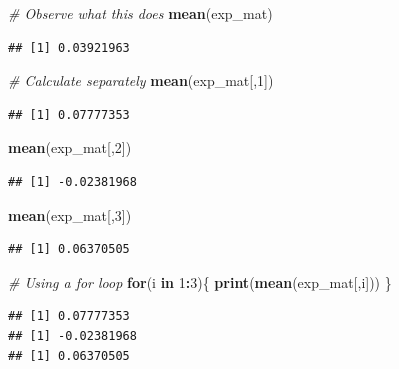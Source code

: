 \documentclass[12pt,]{krantz}
\newenvironment{Shaded}{\begin{snugshade}}{\end{snugshade}}
\newcommand{\KeywordTok}[1]{\textcolor[rgb]{0.27,0.27,0.27}{\textbf{#1}}}
\newcommand{\DecValTok}[1]{\textcolor[rgb]{0.06,0.06,0.06}{#1}}
\newcommand{\CommentTok}[1]{\textcolor[rgb]{0.37,0.37,0.37}{\textit{#1}}}
\newcommand{\ControlFlowTok}[1]{\textcolor[rgb]{0.27,0.27,0.27}{\textbf{#1}}}
\newcommand{\OperatorTok}[1]{\textcolor[rgb]{0.43,0.43,0.43}{\textbf{#1}}}
\newcommand{\NormalTok}[1]{#1}
\begin{document}
\begin{Shaded}
\begin{Highlighting}[]
\CommentTok{# Observe what this does}
\KeywordTok{mean}\NormalTok{(exp_mat)}
\end{Highlighting}
\end{Shaded}

\begin{verbatim}
## [1] 0.03921963
\end{verbatim}

\begin{Shaded}
\begin{Highlighting}[]
\CommentTok{# Calculate separately }
\KeywordTok{mean}\NormalTok{(exp_mat[,}\DecValTok{1}\NormalTok{])}
\end{Highlighting}
\end{Shaded}

\begin{verbatim}
## [1] 0.07777353
\end{verbatim}

\begin{Shaded}
\begin{Highlighting}[]
\KeywordTok{mean}\NormalTok{(exp_mat[,}\DecValTok{2}\NormalTok{])}
\end{Highlighting}
\end{Shaded}

\begin{verbatim}
## [1] -0.02381968
\end{verbatim}

\begin{Shaded}
\begin{Highlighting}[]
\KeywordTok{mean}\NormalTok{(exp_mat[,}\DecValTok{3}\NormalTok{])}
\end{Highlighting}
\end{Shaded}

\begin{verbatim}
## [1] 0.06370505
\end{verbatim}

\begin{Shaded}
\begin{Highlighting}[]
\CommentTok{# Using a for loop }
\ControlFlowTok{for}\NormalTok{(i }\ControlFlowTok{in} \DecValTok{1}\OperatorTok{:}\DecValTok{3}\NormalTok{)\{}
  \KeywordTok{print}\NormalTok{(}\KeywordTok{mean}\NormalTok{(exp_mat[,i]))}
\NormalTok{\}}
\end{Highlighting}
\end{Shaded}

\begin{verbatim}
## [1] 0.07777353
## [1] -0.02381968
## [1] 0.06370505
\end{verbatim}
\end{document}

